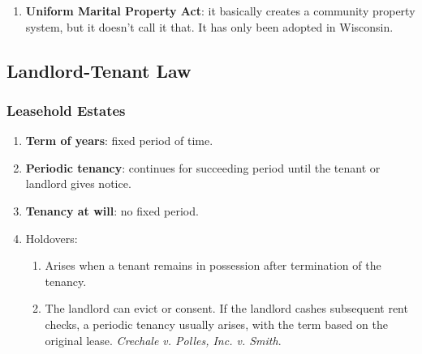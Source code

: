 \begin{enumerate}
\begin{enumerate}
        in one spouse's name or if one of the souse is operating a business on 
        the property. If the husband and wife are equal managers, \textbf{the 
        creditors of either can reach the community property}.
        \item \textbf{Divorce}: \emph{equitable} division; sometimes 
        \emph{equal} division.
        \item \textbf{Death}: each spouse can transfer by will half of 
        community property and all of his or her separate property. If one 
        spouse dies intestate, that spouse's share passes to the surviving 
        spouse.\footnote{Casebook p. 390.}
        \item \textbf{Migrating couples}: when couples move, their property 
        retains its status as community property or common law property.
        \item What happens when couples mix separate property with community 
        property? States differ. See 'Mixing Community Property with Separate 
        Property Problems.'
    \end{enumerate}
    \item \textbf{Uniform Marital Property Act}: it basically creates a 
    community property system, but it doesn't call it that. It has only been 
    adopted in Wisconsin.
\end{enumerate}

\subsection{Landlord-Tenant Law}

\subsubsection{Leasehold Estates}

\begin{enumerate}
    \item \textbf{Term of years}: fixed period of time.
    \item \textbf{Periodic tenancy}: continues for succeeding period until 
    the tenant or landlord gives notice.
    \item \textbf{Tenancy at will}: no fixed period.
    \item Holdovers:
    \begin{enumerate}
        \item Arises when a tenant remains in possession after termination of 
        the tenancy.
        \item The landlord can evict or consent. If the landlord cashes 
        subsequent rent checks, a periodic tenancy usually arises, with the 
        term based on the original lease. \emph{Crechale v. Polles, Inc. v. 
        Smith}.
    \end{enumerate}
\end{enumerate}

